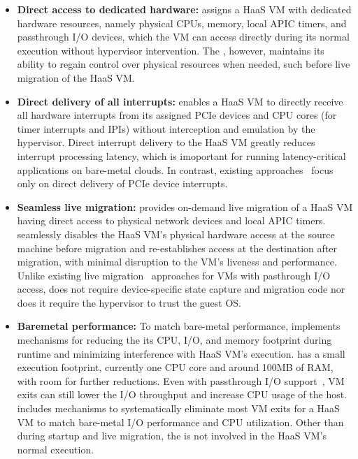 \begin{itemize} 
\parskip 0mm
\itemsep 0mm

\item {\bf Direct access to dedicated hardware:} 
\na assigns a HaaS VM with 
dedicated hardware resources, namely 
physical CPUs, memory, local APIC timers, and passthrough I/O devices,
which the VM can access directly 
during its normal execution without hypervisor intervention. 
The \sna, however, maintains its ability to
regain control over physical resources when needed, such 
before live migration of the HaaS VM.


\item {\bf Direct delivery of all interrupts:}
\na enables a HaaS VM to directly receive all hardware interrupts from 
its assigned PCIe devices and CPU cores (for timer interrupts and IPIs) 
without interception and emulation by the hypervisor.
Direct interrupt delivery to the HaaS VM greatly
reduces interrupt processing latency, which is imoportant for running 
latency-critical applications on bare-metal clouds.
In contrast, existing approaches~\cite{vfio,postedinterrupt,amit:2015,tu:2015}
focus only on direct delivery of PCIe device interrupts.


\item {\bf Seamless live migration:}
\na provides on-demand live migration of a HaaS VM having direct access to 
physical network devices and local APIC timers. 
\na seamlessly disables the HaaS VM's physical hardware access at the 
source machine before migration and 
re-establishes access at the destination after migration,
with minimal disruption to the VM's liveness and performance.
Unlike existing live migration~\cite{vfio-live-migration,blmvisor-journal,ondemand} 
approaches for VMs with pasthrough 
I/O access, \na does not require device-specific state capture and migration code 
nor does it require the hypervisor to trust the guest OS. 

\item {\bf Baremetal performance:}  
To match bare-metal performance, \na implements mechanisms
for reducing the its CPU, I/O, and memory footprint
during runtime and minimizing interference with HaaS VM's execution.
\na has a small execution footprint, currently one 
CPU core and around 100MB of RAM, with room for further reductions.
Even with passthrough I/O support~\cite{intelvtd-paper,intelvtd-manual}, 
VM exits can still lower the I/O throughput and increase CPU usage of the host.
\na includes mechanisms to systematically eliminate
most VM exits for a HaaS VM to match bare-metal I/O performance and CPU utilization.
Other than during startup and live migration, the \na is not involved in the
HaaS VM's normal execution.

\end{itemize}

